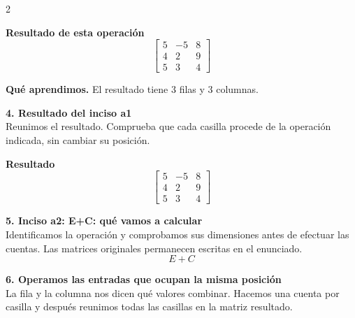 \documentclass[11pt,a4paper,landscape]{article}
\begin{document}
\begin{multicols*}{2}
\begin{minipage}{\linewidth}
\par\smallskip \textbf{Resultado de esta operación}\[\begin{bmatrix}5 & -5 & 8\\4 & 2 & 9\\5 & 3 & 4\end{bmatrix}\]
\par\smallskip\textbf{Qué aprendimos.} El resultado tiene 3 filas y 3 columnas.
\end{minipage}\par\medskip
\noindent\begin{minipage}{\linewidth}\textbf{4. Resultado del inciso a1}\\[2pt]Reunimos el resultado. Comprueba que cada casilla procede de la operación indicada, sin cambiar su posición.
\par\smallskip \textbf{Resultado}\[\begin{bmatrix}5 & -5 & 8\\4 & 2 & 9\\5 & 3 & 4\end{bmatrix}\]
\end{minipage}\par\medskip
\noindent\begin{minipage}{\linewidth}\textbf{5. Inciso a2: E+C: qué vamos a calcular}\\[2pt]Identificamos la operación y comprobamos sus dimensiones antes de efectuar las cuentas. Las matrices originales permanecen escritas en el enunciado.
\[E+C\]
\end{minipage}\par\medskip
\noindent\begin{minipage}{\linewidth}\textbf{6. Operamos las entradas que ocupan la misma posición}\\[2pt]La fila y la columna nos dicen qué valores combinar. Hacemos una cuenta por casilla y después reunimos todas las casillas en la matriz resultado.
\par{}\par\smallskip

\end{minipage}
\end{multicols*}
\end{document}
